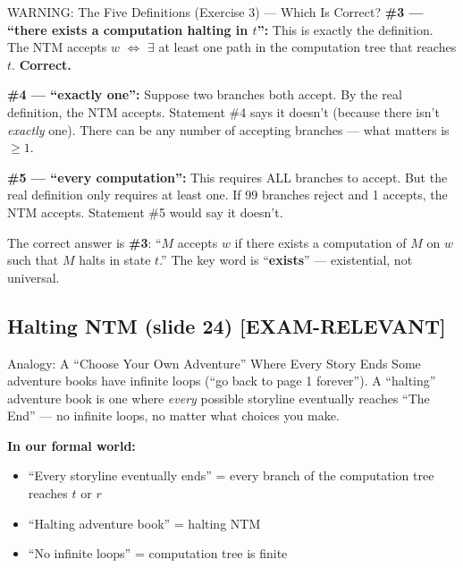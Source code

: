 \documentclass[11pt,a4paper]{article}
\newcommand{\kemark}{\textcolor{red!70!black}{\textbf{[EXAM-RELEVANT]}}}
\newcommand{\kt}[1]{\par\vspace{0.3em}\colorbox{yellow!60}{\parbox{\dimexpr\linewidth-2\fboxsep}{#1}}\vspace{0.3em}}
\begin{document}
\begin{conceptbox}{{WARNING: The Five Definitions (Exercise 3) --- Which Is Correct?}}
\textbf{\#3 --- ``there exists a computation halting in $t$'':} This is exactly the definition. The NTM accepts $w$ $\Leftrightarrow$ $\exists$ at least one path in the computation tree that reaches $t$. \textbf{Correct.}

\textbf{\#4 --- ``exactly one'':} Suppose two branches both accept. By the real definition, the NTM accepts. Statement \#4 says it doesn't (because there isn't \textit{exactly} one). There can be any number of accepting branches --- what matters is $\geq 1$.

\textbf{\#5 --- ``every computation'':} This requires ALL branches to accept. But the real definition only requires at least one. If 99 branches reject and 1 accepts, the NTM accepts. Statement \#5 would say it doesn't.

\kt{The correct answer is \textbf{\#3}: ``$M$ accepts $w$ if there exists a computation of $M$ on $w$ such that $M$ halts in state $t$.'' The key word is ``\textbf{exists}'' --- existential, not universal.}
\end{conceptbox}

\subsection{Halting NTM (slide 24) \kemark}

\begin{notebox}{Analogy: A ``Choose Your Own Adventure'' Where Every Story Ends}
Some adventure books have infinite loops (``go back to page 1 forever''). A ``halting'' adventure book is one where \textit{every} possible storyline eventually reaches ``The End'' --- no infinite loops, no matter what choices you make.

\textbf{In our formal world:}
\begin{itemize}[nosep]
\item ``Every storyline eventually ends'' = every branch of the computation tree reaches $t$ or $r$
\item ``Halting adventure book'' = halting NTM
\item ``No infinite loops'' = computation tree is finite
\end{itemize}
\end{notebox}
\end{document}
